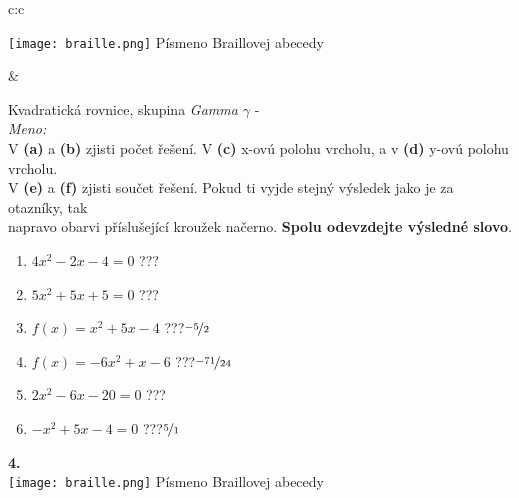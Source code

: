 \documentclass[10pt]{report}
\begin{document}
\begin{tabular}{c:c}
\begin{minipage}[c][99mm][t]{0.49\linewidth}
\begin{center}
\begin{minipage}{0.20\linewidth}
\begin{center}
\texttt{[image: braille.png]}
{\small Písmeno Braillovej abecedy}
\end{center}
\end{minipage}
\end{center}
\end{minipage}
&
\begin{minipage}[c][99mm][t]{0.49\linewidth}
\begin{center}
\vspace{7mm}
{\huge Kvadratická rovnice, skupina \textit{Gamma $\gamma$} -}\\[4.5mm]
\textit{Meno:}\phantom{xxxxxxxxxxxxxxxxxxxxxxxxxxxxxxxxxxxxxxxxxxxxxxxxxxxxxxxxxxxxxxxxx}\\[3.5mm]
V \textbf{(a)} a \textbf{(b)} zjisti počet řešení. V \textbf{(c)} x-ovú polohu vrcholu, a v \textbf{(d)} y-ovú polohu vrcholu.\\V \textbf{(e)} a \textbf{(f)} zjisti součet řešení. Pokud ti vyjde stejný výsledek jako je za otazníky, tak\\napravo obarvi příslušející kroužek načerno. \textbf{Spolu odevzdejte výsledné slovo}.\\[3mm]
\begin{minipage}{0.77\linewidth}
\begin{center}
\begin{varwidth}{\textwidth}
\begin{enumerate}
\large
\item $4x^2-2x-4=0$\quad \dotfill\; ???\;\dotfill {}
\item $5x^2+5x+5=0$\quad \dotfill\; ???\;\dotfill {}
\item $f(x)=x^2+5x-4$\quad \dotfill\; ???\;\dotfill \quad $\nicefrac{-5}{2}$
\item $f(x)=-6x^2+x-6$\quad \dotfill\; ???\;\dotfill \quad $\nicefrac{-71}{24}$
\item $2x^2-6x-20=0$\quad \dotfill\; ???\;\dotfill {}
\item $-x^2+5x-4=0$\quad \dotfill\; ???\;\dotfill \quad $\nicefrac{5}{1}$
\end{enumerate}
\end{varwidth}
\end{center}
\end{minipage}
\begin{minipage}{0.20\linewidth}
\begin{center}
{\Huge\bfseries 4.} \\[2mm]
\texttt{[image: braille.png]}
{\small Písmeno Braillovej abecedy}
\end{center}
\end{minipage}
\end{center}
\end{minipage}

\end{tabular}
\end{document}
